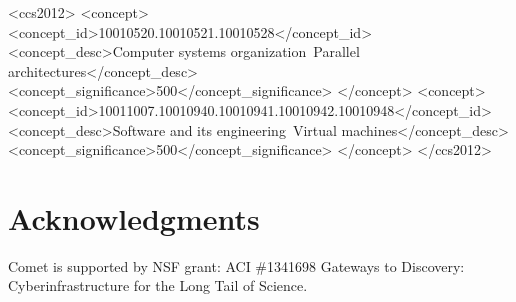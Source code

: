 \documentclass{sig-alternate-05-2015}
\makeatletter
\def\contentsname{Contents}
\def\tableofcontents{%
    \section*{\MakeUppercase{\contentsname}}%
    \@starttoc{toc}%
    }
\makeatother
\begin{document}
\begin{comment}
\begin{center}
{\Large \TITLE}
\end{center}
\tableofcontents

\newpage
\end{comment}

\maketitle



%
%
\begin{CCSXML}
<ccs2012>
<concept>
<concept_id>10010520.10010521.10010528</concept_id>
<concept_desc>Computer systems organization~Parallel architectures</concept_desc>
<concept_significance>500</concept_significance>
</concept>
<concept>
<concept_id>10011007.10010940.10010941.10010942.10010948</concept_id>
<concept_desc>Software and its engineering~Virtual machines</concept_desc>
<concept_significance>500</concept_significance>
</concept>
</ccs2012>
\end{CCSXML}


%
%

%
%
\printccsdesc



\newcommand{\Comet}{{\em Comet\/}}















\section{Acknowledgments}

Comet is supported by NSF grant: ACI \#1341698 Gateways to Discovery:
Cyberinfrastructure for the Long Tail of Science. 



\end{document}
